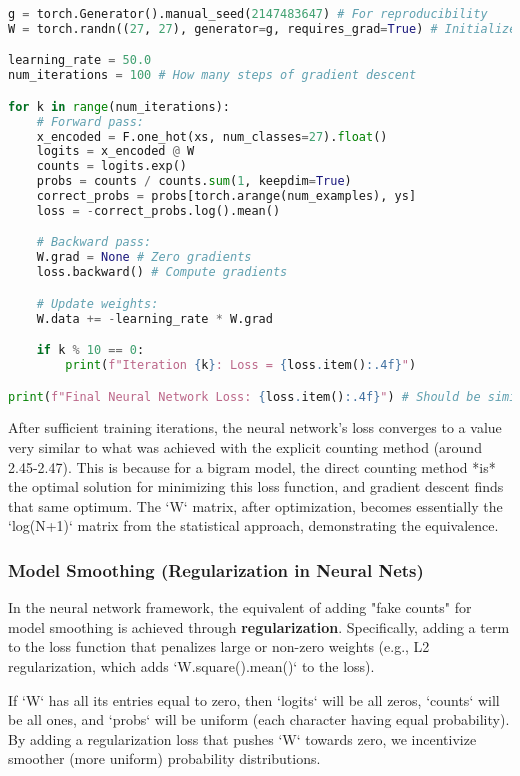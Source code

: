 \begin{lstlisting}[language=Python, caption=Training Loop (Gradient Descent)]
g = torch.Generator().manual_seed(2147483647) # For reproducibility
W = torch.randn((27, 27), generator=g, requires_grad=True) # Initialize W

learning_rate = 50.0
num_iterations = 100 # How many steps of gradient descent

for k in range(num_iterations):
    # Forward pass:
    x_encoded = F.one_hot(xs, num_classes=27).float()
    logits = x_encoded @ W
    counts = logits.exp()
    probs = counts / counts.sum(1, keepdim=True)
    correct_probs = probs[torch.arange(num_examples), ys]
    loss = -correct_probs.log().mean()

    # Backward pass:
    W.grad = None # Zero gradients
    loss.backward() # Compute gradients

    # Update weights:
    W.data += -learning_rate * W.grad

    if k % 10 == 0:
        print(f"Iteration {k}: Loss = {loss.item():.4f}")

print(f"Final Neural Network Loss: {loss.item():.4f}") # Should be similar to ~2.45
\end{lstlisting}

After sufficient training iterations, the neural network's loss converges to a value very similar to what was achieved with the explicit counting method (around 2.45-2.47). This is because for a bigram model, the direct counting method *is* the optimal solution for minimizing this loss function, and gradient descent finds that same optimum. The `W` matrix, after optimization, becomes essentially the `log(N+1)` matrix from the statistical approach, demonstrating the equivalence.

\subsubsection{Model Smoothing (Regularization in Neural Nets)}
In the neural network framework, the equivalent of adding "fake counts" for model smoothing is achieved through \textbf{regularization}. Specifically, adding a term to the loss function that penalizes large or non-zero weights (e.g., L2 regularization, which adds `W.square().mean()` to the loss).

If `W` has all its entries equal to zero, then `logits` will be all zeros, `counts` will be all ones, and `probs` will be uniform (each character having equal probability). By adding a regularization loss that pushes `W` towards zero, we incentivize smoother (more uniform) probability distributions.

